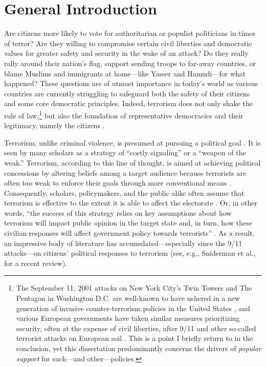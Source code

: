 \section{General Introduction}
\label{sec:11}

Are citizens more likely to vote for authoritarian or populist politicians in times of terror? Are they willing to compromise certain civil liberties and democratic values for greater safety and security in the wake of an attack? Do they really rally around their nation's flag, support sending troops to far-away countries, or blame Muslims and immigrants at home---like Yasser and Hamudi---for what happened? These questions are of utmost importance in today's world as various countries are currently struggling to safeguard both the safety of their citizens and some core democratic principles. Indeed, terrorism does not only shake the rule of law,\footnote{The September 11, 2001 attacks on New York City's Twin Towers and The Pentagon in Washington D.C. are well-known to have ushered in a new generation of invasive counter-terrorism policies in the United States \citep{Brooks2013, Kundnani2014}, and various European governments have taken similar measures prioritizing security, often at the expense of civil liberties, after 9/11 and other so-called terrorist attacks on European soil \citep{Bigo2015,EU2005}. This is a point I briefly return to in the conclusion, yet this dissertation predominantly concerns the drivers of \textit{popular support} for such---and other---policies.} but also the foundation of representative democracies and their legitimacy, namely the citizens \citep{VanHauwaert2020a}.


Terrorism, unlike criminal violence, is presumed at pursuing a political goal \citep{Hoffman2017, Richards2014}. It is seen by many scholars as a strategy of ``costly signaling'' or a ``weapon of the weak.'' Terrorism, according to this line of thought, is aimed at achieving political concessions by altering beliefs among a target audience because terrorists are often too weak to enforce their goals through more conventional means \citep[including traditional warfare;][p. 50]{Kydd2006}. Consequently, scholars, policymakers, and the public alike often assume that terrorism is effective to the extent it is able to affect the electorate \citep{Crenshaw1986}. Or, in other words, ``the success of this strategy relies on key assumptions about how terrorism will impact public opinion in the target state and, in turn, how these civilian responses will affect government policy towards terrorists'' \citep[][p. 1]{Wayne2019}. As a result, an impressive body of literature has accumulated---especially since the 9/11 attacks---on citizens' political responses to terrorism (see, e.g., Sniderman et al., \citeyear{Sniderman2019a} for a recent review).


